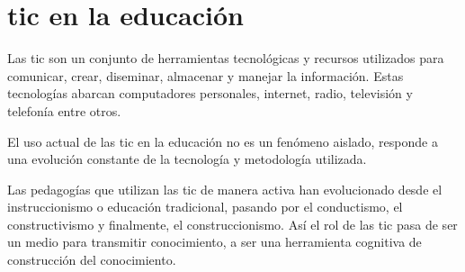 \section{\Gls{tic} en la educación}

Las \Gls{tic} son un conjunto de herramientas tecnológicas y recursos utilizados
para comunicar, crear, diseminar, almacenar y manejar la
información\cite{unesco:ict}. Estas tecnologías abarcan computadores personales,
internet, radio, televisión y telefonía\cite{tinio:ict,} entre otros.

El uso actual de las \Gls{tic} en la educación no es un fenómeno aislado,
responde a una evolución constante de la tecnología y metodología
utilizada\cite{egenfeldt2007third}.

Las pedagogías que utilizan las \gls{tic} de manera activa han evolucionado
desde el instruccionismo o educación tradicional, pasando por el conductismo, el
constructivismo y finalmente, el
construccionismo\cite{egenfeldt2007third,white:ict}. Así el rol de las \gls{tic}
pasa de ser un medio para transmitir conocimiento, a ser una herramienta
cognitiva de construcción del
conocimiento\cite{ict:ttc,valdivia:sg,sasha:construtivism}.

